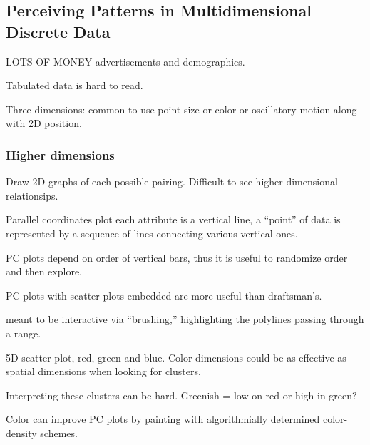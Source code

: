 \begin{mdframed}\begin{multicols}{2}
\subsection{Perceiving Patterns in Multidimensional Discrete Data}
\begin{compactdesc}
    \item[LOTS OF MONEY] advertisements and demographics.
    \item[Tabulated data] is hard to read.
    \item[Three dimensions:] common to use point size or color or oscillatory
        motion along with 2D position.
\end{compactdesc}


\subsubsection{Higher dimensions}
\begin{compactdesc}
    \item[Draw 2D graphs] of each possible pairing. Difficult to see higher
        dimensional relationsips.
    \item[Parallel coordinates plot] each attribute is a vertical line,
        a ``point'' of data is represented by a sequence of lines connecting
        various vertical ones.
    \item[PC plots depend on order] of vertical bars, thus it is useful to
        randomize order and then explore.
    \item[PC plots with scatter plots] embedded are more useful than
        draftsman's.
    \item[meant to be interactive] via ``brushing,'' highlighting the polylines
        passing through a range.
    \item[5D] scatter plot, red, green and blue. Color dimensions could be
        as effective as spatial dimensions when looking for clusters.
    \item[Interpreting] these clusters can be hard. Greenish = low on red
        or high in green?
    \item[Color can improve PC plots] by painting with algorithmially
        determined color-density schemes.
\end{compactdesc}


\end{multicols}
\end{mdframed}
